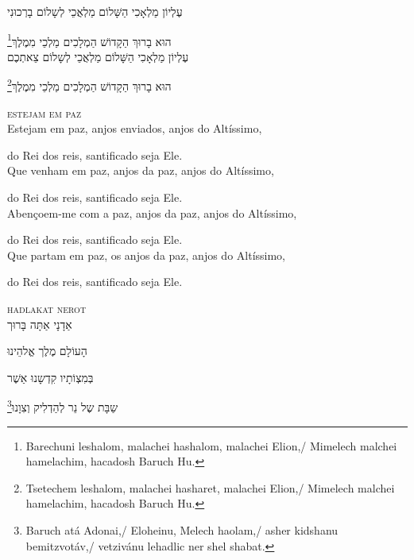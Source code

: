 עֶלְיוֹן מַלְאָכִי הַשָּׁלוֹם מַלְאֲכֵי לְשָלוֹם בָרְכוּנִי

\footnote{Barechuni leshalom, malachei hashalom, malachei Elion,/ Mimelech malchei hamelachim, hacadosh Baruch Hu.}הוּא בָרוּךְ הַקָדוֹשׁ הַמְלָכִים מַלְכֵי מִמֶלֶךְ\\[10pt] 

עֶלְיוֹן מַלְאָכִי הַשָּׁלוֹם מַלְאֲכֵי לְשָלוֹם צֵאתְכֶם 

\footnote{Tsetechem leshalom, malachei hasharet, malachei Elion,/ Mimelech malchei hamelachim, hacadosh Baruch Hu.}הוּא בָרוּךְ הַקָדוֹשׁ הַמְלָכִים מַלְכֵי מִמֶלֶךְ


\movetooddpage
\raggedright

\vspace*{1cm}

\textsc{estejam em paz}\\[15pt]


Estejam em paz, anjos enviados, anjos do Altíssimo,

do Rei dos reis, santificado seja Ele.\\[10pt]

Que venham em paz, anjos da paz, anjos do Altíssimo,

do Rei dos reis, santificado seja Ele.\\[10pt]

Abençoem-me com a paz, anjos da paz, anjos do Altíssimo,

do Rei dos reis, santificado seja Ele.\\[10pt]

Que partam em paz, os anjos da paz, anjos do Altíssimo,

do Rei dos reis, santificado seja Ele.

\movetoevenpage
\raggedleft




\vspace*{1cm}

\textsc{hadlakat nerot}\\[15pt]

אַדָנָי אַתָּה בָּרוּך

הָעוֹלָם מֶלֶך אֱלהֵינוּ

בְּמִצְוֹתָיו קִדְשָנוּ אַשֶׁר

\footnote{Baruch atá Adonai,/ Eloheinu, Melech haolam,/ asher kidshanu bemitzvotáv,/ vetzivánu lehadlic ner shel shabat.}שַבָּת שֶל נֵר לְהַדְלִיק וְצִוָנוּ‏

\movetooddpage
\raggedright

